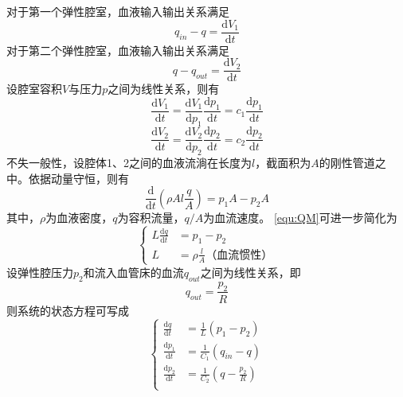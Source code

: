 对于第一个弹性腔室，血液输入输出关系满足
\begin{equation}
    \label{equ:QS1}
    q_{in}-q=\frac{\mathrm{d} V_{1}}{\mathrm{d} t}
\end{equation}
对于第二个弹性腔室，血液输入输出关系满足
\begin{equation}
    \label{equ:QS2}
    q-q_{out}=\frac{\mathrm{d} V_{2}}{\mathrm{d} t}
\end{equation}
设腔室容积$V$与压力$p$之间为线性关系，则有
\begin{equation}
    \label{equ:QSV1}
    \frac{\mathrm{d} V_{1}}{\mathrm{d} t}
    =\frac{\mathrm{d} V_{1}}{\mathrm{d} p_{1}}\frac{\mathrm{d} p_{1}}{\mathrm{d} t}
    =c_{1}\frac{\mathrm{d} p_{1}}{\mathrm{d} t}
\end{equation}
\begin{equation}
    \label{equ:QSV2}
    \frac{\mathrm{d} V_{2}}{\mathrm{d} t}
    =\frac{\mathrm{d} V_{2}}{\mathrm{d} p_{2}}\frac{\mathrm{d} p_{2}}{\mathrm{d} t}
    =c_{2}\frac{\mathrm{d} p_{2}}{\mathrm{d} t}
\end{equation}
不失一般性，设腔体1、2之间的血液流淌在长度为$l$，截面积为$A$的刚性管道之中。依据动量守恒，则有
\begin{equation}
    \label{equ:QM}
    \frac{\mathrm{d}}{\mathrm{d} t}\left ( \rho Al\frac{q}{A} \right )=p_{1}A-p_{2}A
\end{equation}
其中，$\rho$为血液密度，$q$为容积流量，$q/A$为血流速度。
\autoref{equ:QM}可进一步简化为
\begin{equation}
    \left \{
    \begin{aligned}
        L\frac{\mathrm{d} q}{\mathrm{d} t} &= p_{1}-p_{2} \\
        L &=\rho \frac{l}{A} \text{（血流惯性）}
    \end{aligned}
    \right.
\end{equation}
设弹性腔压力$p_{2}$和流入血管床的血流$q_{out}$之间为线性关系，即
\begin{equation}
    \label{equ:pq}
    q_{out}=\frac{p_{2}}{R}
\end{equation}
则系统的状态方程可写成
\begin{equation}
    \left \{
    \begin{aligned}
        \frac{\mathrm{d} q}{\mathrm{d} t} &= \frac{1}{L}(p_{1}-p_{2}) \\
        \frac{\mathrm{d} p_{1}}{\mathrm{d} t} &= \frac{1}{C_{1}}(q_{in}-q) \\
        \frac{\mathrm{d} p_{2}}{\mathrm{d} t} &= \frac{1}{C_{2}}(q-\frac{p_{2}}{R}) \\
    \end{aligned}
    \right.
\end{equation}
